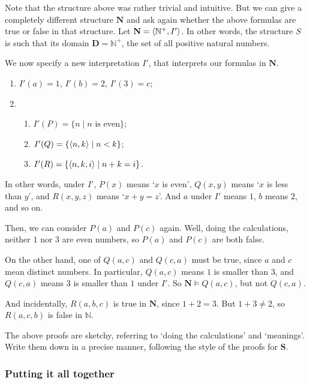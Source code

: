 Note that the structure above was rather trivial and intuitive. But we can give a completely different structure $\mathbf{N}$ and ask again whether the above formulas are true or false in that structure. Let $\mathbf{N}=\langle\mathbb{N}^+, I'\rangle$. In other words, the structure $S$ is such that its domain $\mathbf{D}=\mathbb{N}^+$, the set of all positive natural numbers. 

We now specify a new interpretation $I'$, that interprets our formulas in $\mathbf{N}$. 

\begin{enumerate}
	\item $I'(a)=1$, $I'(b)=2$, $I'(3)=c$;
	\item 
		\begin{enumerate}
		\item $I'(P)=\{n \mid n\text{ is even}\}$;
		\item $I'(Q)=\{\langle n, k\rangle \mid n < k\}$;
		\item $I'(R)=\{\langle n, k, i\rangle \mid n+k=i\}$. 
		\end{enumerate}
\end{enumerate}

In other words, under $I'$, $P(x)$ means `$x$ is even', $Q(x, y)$ means `$x$ is less than $y$', and $R(x, y, z)$ means `$x+y=z$'. And $a$ under $I'$ means $1$, $b$ means $2$, and so on.

Then, we can consider $P(a)$ and $P(c)$ again. Well, doing the calculations, neither $1$ nor $3$ are even numbers, so $P(a)$ and $P(c)$ are both false. 

On the other hand, one of $Q(a, c)$ and $Q(c, a)$ must be true, since $a$ and $c$ mean distinct numbers. In particular, $Q(a, c)$ means $1$ is smaller than $3$, and $Q(c, a)$ means $3$ is smaller than $1$ under $I'$. So $\mathbf{N}\models Q(a, c)$, but not $Q(c, a)$. 

And incidentally, $R(a, b, c)$ is true in $\mathbf{N}$, since $1+2=3$. But $1+3\neq 2$, so $R(a, c, b)$ is false in $\mathbb{N}$. 

\begin{exc}
The above proofs are sketchy, referring to `doing the calculations' and `meanings'. Write them down in a precise manner, following the style of the proofs for $\mathbf{S}$. 
\end{exc}

\subsubsection{Putting it all together}

